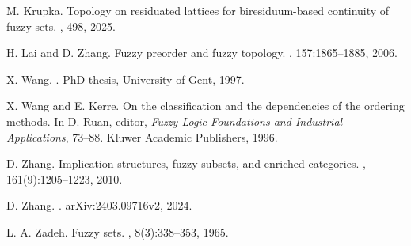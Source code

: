 \documentclass[preprint,3p,times]{elsarticle}
\theoremstyle{plain}
\theoremstyle{definition}
\numberwithin{equation}{section}
\begin{document}
\begin{thebibliography}{}
M. Krupka.
\newblock Topology on residuated lattices for biresiduum-based continuity of fuzzy sets.
, 498, 2025.

H. Lai and D. Zhang.
\newblock Fuzzy preorder and fuzzy topology.
, 157:1865--1885, 2006.

X. Wang.
.
\newblock PhD thesis, University of Gent, 1997.

X. Wang and E. Kerre.
\newblock On the classification and the dependencies of the ordering methods.
\newblock  In D. Ruan, editor, { \em Fuzzy Logic Foundations and Industrial Applications}, 73--88. Kluwer Academic Publishers, 1996.



D. Zhang.
\newblock Implication structures, fuzzy subsets, and enriched categories.
, 161(9):1205--1223, 2010.

D. Zhang.
.
\newblock arXiv:2403.09716v2, 2024.

L. A. Zadeh.
\newblock Fuzzy sets.
, 8(3):338--353, 1965.


\end{thebibliography}
\end{document}

